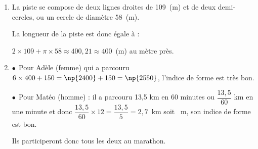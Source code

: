 %
%
%
%

\begin{enumerate}
\item %
La piste se compose de deux lignes droites de 109~(m) et de deux demi-cercles, ou un cercle de diamètre 58~(m).

La longueur de la piste est donc égale à :

$2\times 109 + \pi \times 58 \approx 400,21 \approx 400$~(m) au mètre près.
\item %

$\bullet~~$Pour Adèle (femme) qui a parcouru $6 \times 400 + 150 = \np{2400} + 150 = \np{2550}$, l'indice de forme est très bon.

$\bullet~~$Pour Matéo (homme) : il a parcouru 13,5 km en 60 minutes ou $\dfrac{13,5}{60}$ km en une minute et donc $\dfrac{13,5}{60}\times 12 = \dfrac{13,5}{5} = 2,7$~km soit ~m, son indice de forme est bon.

Ils participeront donc tous les deux au marathon.
\end{enumerate}

\bigskip

